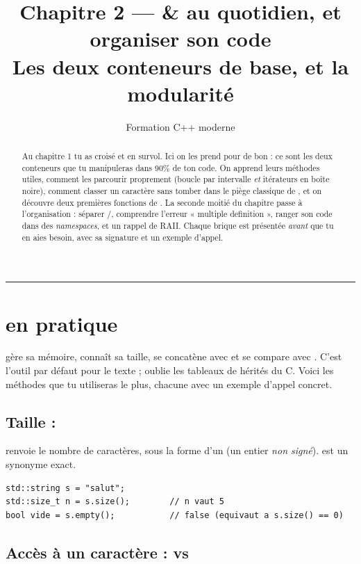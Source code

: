 \documentclass[11pt]{article}
\title{\textbf{Chapitre 2 — \code{string} \& \code{vector} au quotidien,
       et organiser son code}\\[0.3em]
       \large Les deux conteneurs de base, et la modularité}
\author{Formation C++ moderne}
\date{}
\begin{document}
\maketitle

\begin{abstract}
\noindent Au chapitre 1 tu as croisé  et 
en survol. Ici on les prend pour de bon : ce sont les deux conteneurs que tu
manipuleras dans 90\% de ton code. On apprend leurs méthodes utiles, comment
les parcourir proprement (boucle par intervalle \emph{et} itérateurs en boîte
noire), comment classer un caractère sans tomber dans le piège classique de
, et on découvre deux premières fonctions de .
La seconde moitié du chapitre passe à l'organisation : séparer
/, comprendre l'erreur « multiple definition », ranger son
code dans des \emph{namespaces}, et un rappel de RAII. Chaque brique est
présentée \emph{avant} que tu en aies besoin, avec sa signature et un exemple
d'appel.
\end{abstract}

\tableofcontents
\bigskip\hrule\bigskip

\section{ en pratique}

 gère sa mémoire, connaît sa taille, se concatène avec
\code{+} et se compare avec \code{==}. C'est l'outil par défaut pour le texte ;
oublie les tableaux de  hérités du C. Voici les méthodes que tu
utiliseras le plus, chacune avec un exemple d'appel concret.

\subsection*{Taille : }

 renvoie le nombre de caractères, sous la forme d'un
 (un entier \emph{non signé}).  est un
synonyme exact.

\begin{lstlisting}
std::string s = "salut";
std::size_t n = s.size();        // n vaut 5
bool vide = s.empty();           // false (equivaut a s.size() == 0)
\end{lstlisting}

\subsection*{Accès à un caractère :  vs \code{[i]}}
\end{document}

